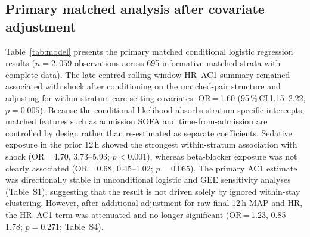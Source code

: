 \documentclass[referee,lineno,pdflatex]{sn-article-template/sn-jnl}
\begin{document}
\subsection{Primary matched analysis after covariate adjustment}
\label{sec:res-model}

Table~\ref{tab:model} presents the primary matched conditional logistic regression
results ($n = 2{,}059$ observations across 695 informative matched strata with
complete data).
The late-centred rolling-window HR~AC1 summary remained associated with shock after conditioning on the
matched-pair structure and adjusting for within-stratum care-setting covariates:
OR\,=\,1.60 (95\,\%\,CI\,1.15--2.22, $p = 0.005$).
Because the conditional likelihood absorbs stratum-specific intercepts, matched
features such as admission SOFA and time-from-admission are controlled by design
rather than re-estimated as separate coefficients.
Sedative exposure in the prior 12\,h showed the strongest within-stratum association
with shock (OR\,=\,4.70, 3.73--5.93; $p<0.001$), whereas beta-blocker exposure was
not clearly associated (OR\,=\,0.68, 0.45--1.02; $p=0.065$).
The primary AC1 estimate was directionally stable in unconditional logistic and GEE
sensitivity analyses (Table~S1), suggesting that the result is not driven solely by
ignored within-stay clustering.
However, after additional adjustment for raw final-12\,h MAP and HR, the HR~AC1 term
was attenuated and no longer significant
(OR\,=\,1.23, 0.85--1.78; $p = 0.271$; Table~S4).
\end{document}
